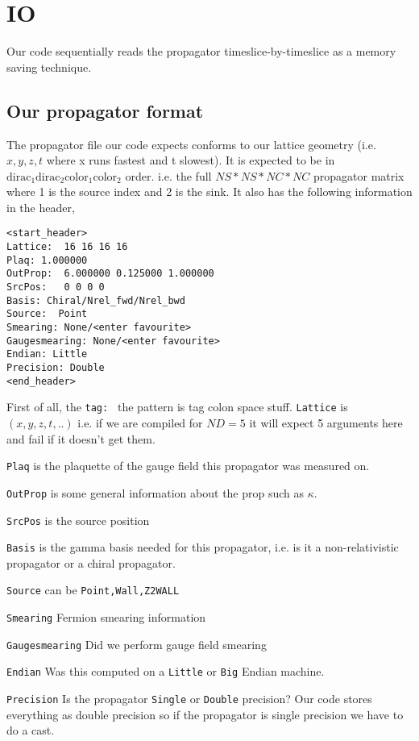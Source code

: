 \section{IO}

Our code sequentially reads the propagator timeslice-by-timeslice
as a memory saving technique.

\subsection{Our propagator format}

The propagator file our code expects conforms to our lattice geometry
(i.e. $x,y,z,t$ where x runs fastest and t slowest). It is expected
to be in $\text{dirac}_1\text{dirac}_2\text{color}_1\text{color}_2$
order. i.e. the full $NS*NS*NC*NC$ propagator matrix where 1 is the
source index and 2 is the sink. It also has the following 
information in the header,

\begin{verbatim}
<start_header>
Lattice:  16 16 16 16
Plaq: 1.000000
OutProp:  6.000000 0.125000 1.000000
SrcPos:   0 0 0 0
Basis: Chiral/Nrel_fwd/Nrel_bwd
Source:  Point
Smearing: None/<enter favourite>
Gaugesmearing: None/<enter favourite>
Endian: Little
Precision: Double
<end_header>
\end{verbatim}

First of all, the \verb|tag: | the pattern is tag colon space stuff.
\verb|Lattice| is $(x,y,z,t,..)$ i.e. if we are compiled for $ND=5$ it will
expect 5 arguments here and fail if it doesn't get them.

\verb|Plaq| is the plaquette of the gauge field this propagator was measured
on.

\verb|OutProp| is some general information about the prop such as $\kappa$.

\verb|SrcPos| is the source position

\verb|Basis| is the gamma basis needed for this propagator, i.e. is it a
non-relativistic propagator or a chiral propagator.

\verb|Source| can be \verb|Point,Wall,Z2WALL|

\verb|Smearing| Fermion smearing information

\verb|Gaugesmearing| Did we perform gauge field smearing

\verb|Endian| Was this computed on a \verb|Little| or \verb|Big| Endian machine.

\verb|Precision| Is the propagator \verb|Single| or \verb|Double| precision?
Our code stores everything as double precision so if the propagator is single
precision we have to do a cast.

